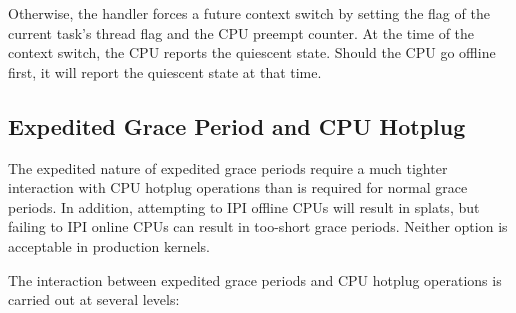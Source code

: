 Otherwise, the handler forces a future context switch by setting the
 flag of the current task's thread flag and the CPU preempt
counter.
At the time of the context switch, the CPU reports the
quiescent state. Should the CPU go offline first, it will report the
quiescent state at that time.


\subsection{Expedited Grace Period and CPU Hotplug}

The expedited nature of expedited grace periods require a much tighter
interaction with CPU hotplug operations than is required for normal
grace periods.
In addition, attempting to IPI offline CPUs will result
in splats, but failing to IPI online CPUs can result in too-short grace
periods.
Neither option is acceptable in production kernels.

The interaction between expedited grace periods and CPU hotplug
operations is carried out at several levels:

